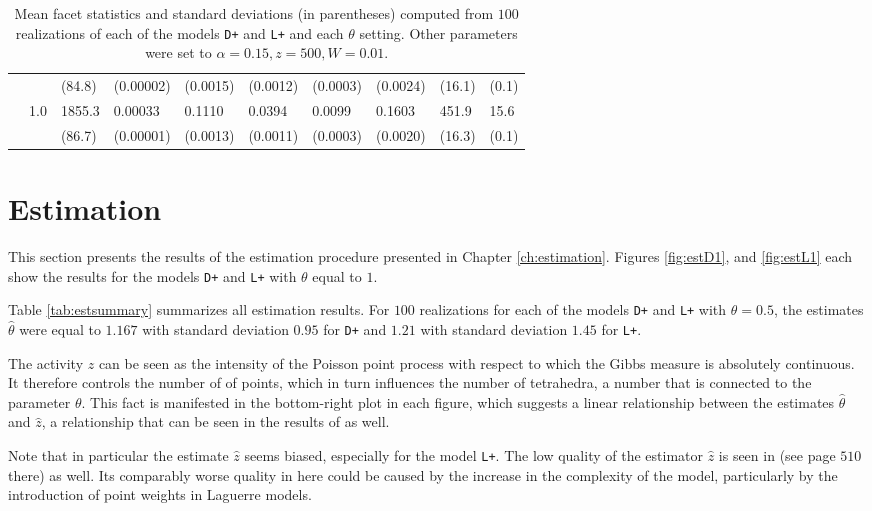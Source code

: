 \begin{landscape}
\begin{table}
\begin{tabular}{lrllllllll}
 & &  (84.8) &  (0.00002) &  (0.0015) &  (0.0012) &  (0.0003) &  (0.0024) &  (16.1) &  (0.1) \\
 & 1.0 &  1855.3 &  0.00033 &  0.1110 &  0.0394 &  0.0099 &  0.1603 &  451.9 &  15.6 \\
 & &  (86.7) &  (0.00001) &  (0.0013) &  (0.0011) &  (0.0003) &  (0.0020) &  (16.3) &  (0.1) \\
\bottomrule
\end{tabular}
\caption{Mean facet statistics and standard deviations (in parentheses) computed from $100$ realizations of each of the models \texttt{D+} and \texttt{L+} and each $\theta$ setting. Other parameters were set to $\alpha=0.15, z=500, W=0.01$.} 
\label{tab:facets}
\end{table}
\end{landscape}



\section{Estimation}
This section presents the results of the estimation procedure presented in Chapter \ref{ch:estimation}. Figures \ref{fig:estD1},  and \ref{fig:estL1} each show the results for the models \texttt{D+} and \texttt{L+}  with $\theta$ equal to $1$.  

Table \ref{tab:estsummary} summarizes all estimation results. For $100$ realizations for each of the models \texttt{D+} and \texttt{L+} with $\theta=0.5$, the estimates $\hat\theta$ were equal to $1.167$ with standard deviation $0.95$ for \texttt{D+} and $1.21$ with standard deviation $1.45$ for \texttt{L+}.

The activity $z$ can be seen as the intensity of the Poisson point process with respect to which the Gibbs measure is absolutely continuous. It therefore controls the number of of points, which in turn influences the number of tetrahedra, a number that is connected to the parameter $\theta$. This fact is manifested in the bottom-right plot in each figure, which suggests a linear relationship between the estimates $\hat\theta$ and $\hat z$, a relationship that can be seen in the results of \cite{DereudreLavancier2011} as well. 

Note that in particular the estimate $\hat z$ seems biased, especially for the model \texttt{L+}. The low quality of the estimator $\hat z$ is seen in \cite{DereudreLavancier2011} (see page $510$ there) as well. Its comparably worse quality in here could be caused by the increase in the complexity of the model, particularly by the introduction of point weights in Laguerre models. 





